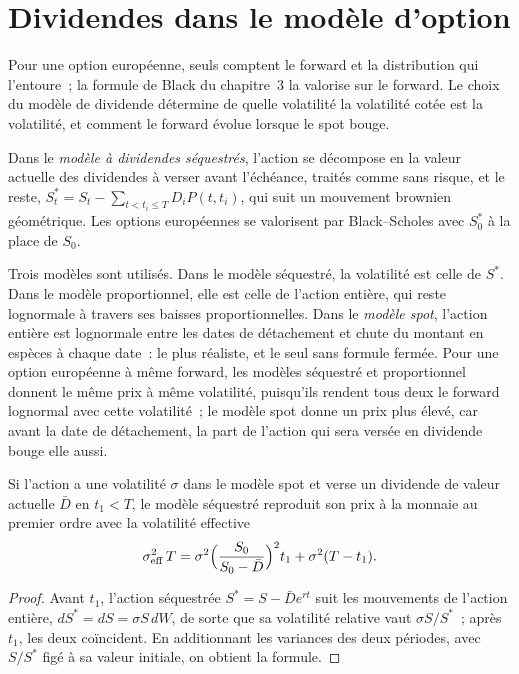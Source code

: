 \section{Dividendes dans le modèle d'option}

Pour une option européenne, seuls comptent le forward et la distribution qui l'entoure~; la
formule de Black du chapitre~3 la valorise sur le forward. Le choix du modèle de dividende
détermine de quelle volatilité la volatilité cotée est la volatilité, et comment le forward
évolue lorsque le spot bouge.

\begin{definition}\label{def:dv:dividends-borrow-and-forwards:escrowed}
Dans le \emph{modèle à dividendes séquestrés}, l'action se
décompose en la valeur actuelle des dividendes à verser avant l'échéance, traités comme
sans risque, et le reste, $S^*_t=S_t-\sum_{t<t_i\le T}D_iP(t,t_i)$, qui suit un
mouvement brownien géométrique. Les options européennes se valorisent par Black--Scholes avec
$S^*_0$ à la place de $S_0$.
\end{definition}

Trois modèles sont utilisés. Dans le modèle séquestré, la volatilité est celle de $S^*$.
Dans le modèle proportionnel, elle est celle de l'action entière, qui reste lognormale
à travers ses baisses proportionnelles. Dans le \emph{modèle spot}, l'action entière est
lognormale entre les dates de détachement et chute du montant en espèces à chaque date~: le plus
réaliste, et le seul sans formule fermée. Pour une option européenne à même forward,
les modèles séquestré et proportionnel donnent le même prix à même
volatilité, puisqu'ils rendent tous deux le forward lognormal avec cette volatilité~; le modèle spot
donne un prix plus élevé, car avant la date de détachement, la part de l'action qui
sera versée en dividende bouge elle aussi.

\begin{proposition}\label{prop:dv:dividends-borrow-and-forwards:adj}
Si l'action a une volatilité $\sigma$ dans le modèle spot et verse un dividende de
valeur actuelle $\bar D$ en $t_1<T$, le modèle séquestré reproduit son prix à la monnaie
au premier ordre avec la volatilité effective
\[
\sigma_{\mathrm{eff}}^2\,T=\sigma^2\Bigl(\frac{S_0}{S_0-\bar D}\Bigr)^2t_1+\sigma^2(T-t_1).
\]
\end{proposition}
\begin{proof}
Avant $t_1$, l'action séquestrée $S^*=S-\bar D e^{rt}$ suit les
mouvements de l'action entière, $dS^*=dS=\sigma S\,dW$, de sorte que sa volatilité relative vaut $\sigma S/S^*$~; après
$t_1$, les deux coïncident. En additionnant les variances des deux périodes, avec $S/S^*$ figé
à sa valeur initiale, on obtient la formule.
\end{proof}

